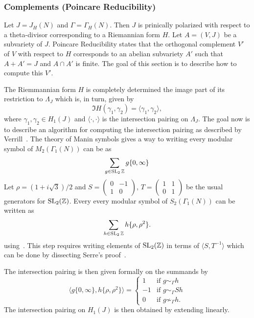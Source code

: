 \documentclass{article}
\begin{document}
\subsubsection{Complements (Poincare Reducibility)}\label{sec:poincare}

Let $J=J_H(N)$ and $\Gamma=\Gamma_H(N)$. Then $J$ is prinically polarized with
respect to a theta-divisor corresponding to a Riemannian form $H$. Let $A=(V,
J)$ be a subvariety of $J$. Poincare Reducibility states that the orthogonal
complement $V'$ of $V$ with respect to $H$ corresponds to an abelian subvariety
$A'$ such that $A+A'=J$ and $A\cap A'$ is finite. The goal of this section is
to describe how to compute this $V'$.

The Riemmannian form $H$ is completely determined the image part of its
restriction to $\Lambda_J$ which is, in turn, given by
\[
    \Im H(\gamma_1, \gamma_2) = \langle \gamma_1, \gamma_2 \rangle,
\]
where $\gamma_1, \gamma_2\in H_1(J)$ and $\langle \cdot,\cdot \rangle$ is the
intersection pairing on $\Lambda_J$. The goal now is to describe an algorithm
for computing the intersection pairing as described by Verrill~\cite[\S
4]{verrill:intersection}. The theory of Manin symbols gives a way to writing
every modular symbol of $M_2(\Gamma_1(N))$ can be as
\[
    \sum_{g\in \operatorname{SL}_2{\mathbb{Z}}} g\{0, \infty\}
\] 
Let $\rho=(1+i\sqrt{3})/2$ and 
$S = \left(
    \begin{smallmatrix}
        0 & -1 \\
        1 & 0
    \end{smallmatrix}
\right)$,
$T = \left(
    \begin{smallmatrix}
        1 & 1 \\
        0 & 1
    \end{smallmatrix}
\right)$ be the usual generators for $\operatorname{SL}_2(\mathbb{Z})$.
Every every modular symbol of $S_2(\Gamma_1(N))$ can be written as
\[
    \sum_{h\in \operatorname{SL}_2{\mathbb{Z}}} h\{\rho, \rho^2\}.
\]
using~\cite[Corollary 4.1]{verrill:intersection}. This step requires writing
elements of $\operatorname{SL}_2(\mathbb{Z})$ in terms of $ \langle S, T^{-1} \rangle$ which can be
done by dissecting Serre's proof~\cite[Chapter 7, Theorem 2]{MR0344216}.

The intersection pairing is then given formally on the summands by
\[
    \langle g\{0,\infty\}, h\{\rho, \rho^2\} \rangle 
    =
    \begin{cases}
        1 & \text{if } g\sim_\Gamma h \\
        -1 & \text{if } g\sim_\Gamma Sh \\
        0 & \text{if } g\not\sim_\Gamma h.
    \end{cases}
\]
The intersection pairing on $H_1(J)$ is then obtained by extending linearly.
\end{document}
